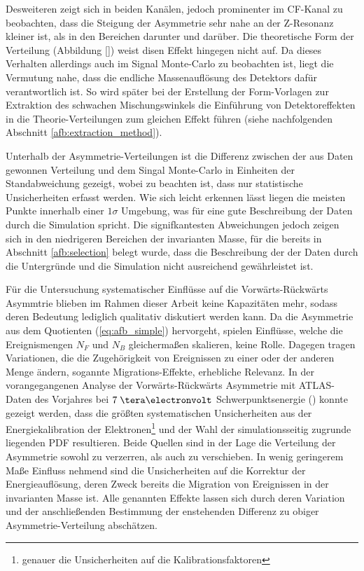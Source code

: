 Desweiteren zeigt sich in beiden Kanälen, jedoch prominenter im \ac{CF}-Kanal
zu beobachten, dass die Steigung der Asymmetrie sehr nahe an der Z-Resonanz
kleiner ist, als in den Bereichen darunter und darüber. Die theoretische Form
der Verteilung (Abbildung \ref{}) weist disen Effekt hingegen nicht auf. Da
dieses Verhalten allerdings auch im Signal Monte-Carlo zu beobachten ist, liegt
die Vermutung nahe, dass die endliche Massenauflösung des Detektors dafür
verantwortlich ist. So wird später bei der Erstellung der Form-Vorlagen zur
Extraktion des schwachen Mischungswinkels die Einführung von Detektoreffekten
in die Theorie-Verteilungen zum gleichen Effekt führen (siehe nachfolgenden
Abschnitt \ref{afb:extraction_method}).

Unterhalb der Asymmetrie-Verteilungen ist die Differenz zwischen der aus Daten
gewonnen Verteilung und dem Singal Monte-Carlo in Einheiten der Standabweichung
gezeigt, wobei zu beachten ist, dass nur statistische Unsicherheiten erfasst
werden. Wie sich leicht erkennen lässt liegen die meisten Punkte innerhalb
einer $1\sigma$ Umgebung, was für eine gute Beschreibung der Daten durch die
Simulation spricht. Die signifkantesten Abweichungen jedoch zeigen sich in den
niedrigeren Bereichen der invarianten Masse, für die bereits in Abschnitt
\ref{afb:selection} belegt wurde, dass die Beschreibung der der Daten durch die
Untergründe und die Simulation nicht ausreichend gewährleistet ist.

Für die Untersuchung systematischer Einflüsse auf die Vorwärts-Rückwärts
Asymmtrie blieben im Rahmen dieser Arbeit keine Kapazitäten mehr, sodass deren
Bedeutung lediglich qualitativ diskutiert werden kann. Da die Asymmetrie aus
dem Quotienten (\ref{eq:afb_simple}) hervorgeht, spielen Einflüsse, welche die
Ereignismengen $N_F$ und $N_B$ gleichermaßen skalieren, keine Rolle. Dagegen 
tragen Variationen, die die Zugehörigkeit von Ereignissen zu einer oder der
anderen Menge ändern, sogannte Migrations-Effekte, erhebliche Relevanz. In der
vorangegangenen Analyse der Vorwärts-Rückwärts Asymmetrie mit \acs{ATLAS}-Daten
des Vorjahres bei $7\TeV$ Schwerpunktsenergie (\cite{ATLAS-CONF-2013-043})
konnte gezeigt werden, dass die größten systematischen Unsicherheiten aus der
Energiekalibration der Elektronen\footnote{genauer die Unsicherheiten auf die
Kalibrationsfaktoren} und der Wahl der simulationsseitig zugrunde liegenden
\acl{PDF} resultieren. Beide Quellen sind in der Lage die Verteilung der
Asymmetrie sowohl zu verzerren, als auch zu verschieben. In wenig geringerem
Maße Einfluss nehmend sind die Unsicherheiten auf die Korrektur der
Energieauflösung, deren Zweck bereits die Migration von Ereignissen in der
invarianten Masse ist. Alle genannten Effekte lassen sich durch deren Variation
und der anschließenden Bestimmung der enstehenden Differenz zu obiger
Asymmetrie-Verteilung abschätzen.



